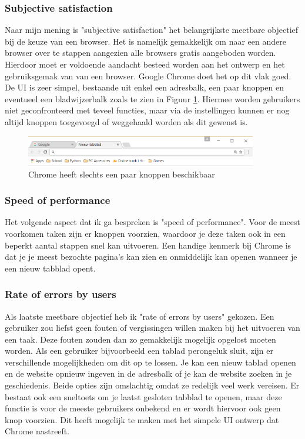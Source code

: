 \documentclass[12pt]{article}
\begin{document}
\subsubsection{Subjective satisfaction}
Naar mijn mening is "subjective satisfaction" het belangrijkste meetbare objectief bij de keuze van een browser. Het is namelijk gemakkelijk om naar een andere browser over te stappen aangezien alle browsers gratis aangeboden worden. Hierdoor moet er voldoende aandacht besteed worden aan het ontwerp en het gebruiksgemak van van een browser. Google Chrome doet het op dit vlak goed. De UI is zeer simpel, bestaande uit enkel een adresbalk, een paar knoppen en eventueel een bladwijzerbalk zoals te zien in Figuur \ref{fig:simpleUI}. Hiermee worden gebruikers niet geconfronteerd met teveel functies, maar via de instellingen kunnen er nog altijd knoppen toegevoegd of weggehaald worden als dit gewenst is.
\begin{figure}
	\centering
	\includegraphics[width=0.9\textwidth]{imgSimpleUI.png}
	\caption{Chrome heeft slechts een paar knoppen beschikbaar}
	\label{fig:simpleUI}
\end{figure}
\subsubsection{Speed of performance}
Het volgende aspect dat ik ga bespreken is "speed of performance". Voor de meest voorkomen taken zijn er knoppen voorzien, waardoor je deze taken ook in een beperkt aantal stappen snel kan uitvoeren. Een handige kenmerk bij Chrome is dat je je meest bezochte pagina's kan zien en onmiddelijk kan openen wanneer je een nieuw tabblad opent.
\subsubsection{Rate of errors by users}
Als laatste meetbare objectief heb ik "rate of errors by users" gekozen. Een gebruiker zou liefst geen fouten of vergissingen willen maken bij het uitvoeren van een taak. Deze fouten zouden dan zo gemakkelijk mogelijk opgelost moeten worden. Als een gebruiker bijvoorbeeld een tablad perongeluk sluit, zijn er verschillende mogelijkheden om dit op te lossen. Je kan een nieuw tablad openen en de website opnieuw ingeven in de adresbalk of je kan de website zoeken in je geschiedenis. Beide opties zijn omslachtig omdat ze redelijk veel werk vereisen. Er bestaat ook een sneltoets om je laatst gesloten tabblad te openen, maar deze functie is voor de meeste gebruikers onbekend en er wordt hiervoor ook geen knop voorzien. Dit heeft mogelijk te maken met het simpele UI ontwerp dat Chrome nastreeft.
\end{document}
